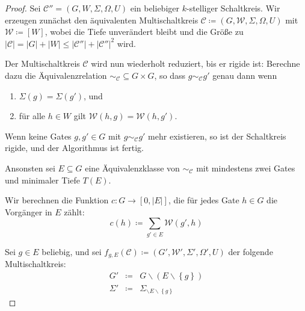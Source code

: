 \begin{proof}
Sei $\mathcal{C}''=\left(G,W,\Sigma,\Omega,U\right)$ ein beliebiger
$k$-stelliger Schaltkreis. Wir erzeugen zunächst den äquivalenten
Multischaltkreis $\mathcal{C}\coloneqq\left(G,\mathcal{W},\Sigma,\Omega,U\right)$
mit $\mathcal{W}\coloneqq\left[W\right]$, wobei die Tiefe unverändert
bleibt und die Größe zu $\left|\mathcal{C}\right|=\left|G\right|+\left|W\right|\leqslant\left|\mathcal{C}''\right|+\left|\mathcal{C}''\right|^{2}$
wird.

Der Multischaltkreis $\mathcal{C}$ wird nun wiederholt reduziert,
bis er rigide ist: Berechne dazu die Äquivalenzrelation $\sim_{\mathcal{C}}\subseteq G\times G$,
so dass $g\sim_{\mathcal{C}}g'$ genau dann wenn

\begin{enumerate}
\item $\Sigma\left(g\right)=\Sigma\left(g'\right)$, und
\item für alle $h\in W$ gilt $\mathcal{W}\left(h,g\right)=\mathcal{W}\left(h,g'\right)$.
\end{enumerate}
Wenn keine Gates $g,g'\in G$ mit $g\sim_{\mathcal{C}}g'$ mehr existieren,
so ist der Schaltkreis rigide, und der Algorithmus ist fertig.

Ansonsten sei $E\subseteq G$ eine Äquivalenzklasse von $\sim_{\mathcal{C}}$
mit mindestens zwei Gates und minimaler Tiefe $T\left(E\right)$. 

Wir berechnen die Funktion $c:G\rightarrow\left[0,\left|E\right|\right]$,
die für jedes Gate $h\in G$ die Vorgänger in $E$ zählt:
\[
c\left(h\right)\coloneqq\sum_{g'\in E}\mathcal{W}\left(g',h\right)
\]

Sei $g\in E$ beliebig, und sei $f_{g,E}\left(\mathcal{C}\right)\coloneqq\left(G',\mathcal{W}',\Sigma',\Omega',U\right)$
der folgende Multischaltkreis:
\begin{eqnarray*}
G' & \coloneqq & G\backslash\left(E\backslash\left\{ g\right\} \right)\\
\Sigma' & \coloneqq & \Sigma_{\backslash E\backslash\left\{ g\right\} }
\end{eqnarray*}


\end{proof}
